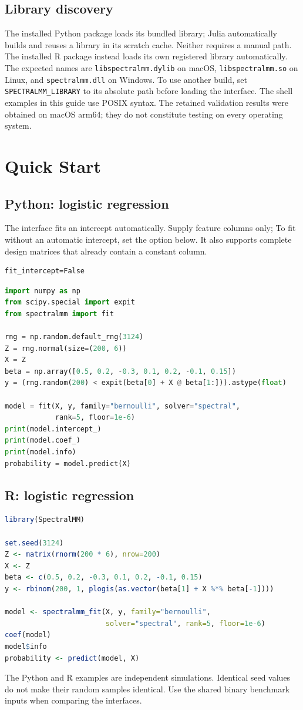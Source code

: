 \documentclass[11pt,a4paper]{article}
\newcommand{\code}[1]{\texttt{#1}}
\begin{document}
\subsection{Library discovery}
The installed Python package loads its bundled library; Julia automatically
builds and reuses a library in its scratch cache. Neither requires a manual path.
The installed R package instead loads its own registered library automatically.
The expected names are \code{libspectralmm.dylib} on macOS,
\code{libspectralmm.so} on Linux, and \code{spectralmm.dll} on Windows.
To use another build, set \code{SPECTRALMM\_LIBRARY} to its absolute path before
loading the interface. The shell examples in this guide use POSIX syntax.
The retained validation results were obtained on macOS arm64; they do not
constitute testing on every operating system.

\section{Quick Start}
\subsection{Python: logistic regression}
The interface fits an intercept automatically. Supply feature columns only;
To fit without an automatic intercept, set the option below. It also supports
complete design matrices that already contain a constant column.
\begin{lstlisting}
fit_intercept=False
\end{lstlisting}
\begin{lstlisting}[language=Python]
import numpy as np
from scipy.special import expit
from spectralmm import fit

rng = np.random.default_rng(3124)
Z = rng.normal(size=(200, 6))
X = Z
beta = np.array([0.5, 0.2, -0.3, 0.1, 0.2, -0.1, 0.15])
y = (rng.random(200) < expit(beta[0] + X @ beta[1:])).astype(float)

model = fit(X, y, family="bernoulli", solver="spectral",
            rank=5, floor=1e-6)
print(model.intercept_)
print(model.coef_)
print(model.info)
probability = model.predict(X)
\end{lstlisting}

\subsection{R: logistic regression}
\begin{lstlisting}[language=R]
library(SpectralMM)

set.seed(3124)
Z <- matrix(rnorm(200 * 6), nrow=200)
X <- Z
beta <- c(0.5, 0.2, -0.3, 0.1, 0.2, -0.1, 0.15)
y <- rbinom(200, 1, plogis(as.vector(beta[1] + X %*% beta[-1])))

model <- spectralmm_fit(X, y, family="bernoulli",
                        solver="spectral", rank=5, floor=1e-6)
coef(model)
model$info
probability <- predict(model, X)
\end{lstlisting}
The Python and R examples are independent simulations. Identical seed values do
not make their random samples identical. Use the shared binary benchmark inputs
when comparing the interfaces.
\end{document}
